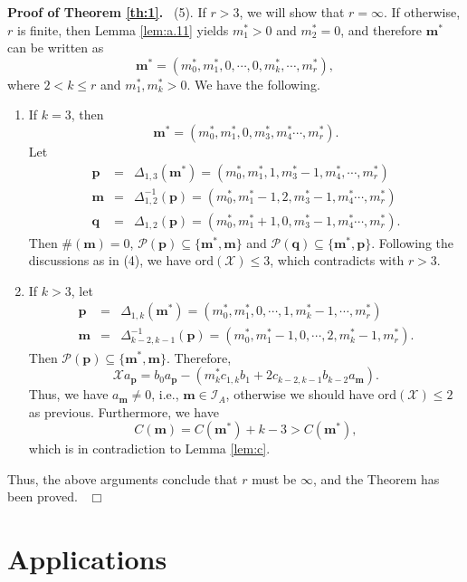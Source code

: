 \documentclass[preprint,12pt]{elsarticle}
\newenvironment{proof}[1][Proof]{\textbf{#1.}\ }{\ $\Box$}
\begin{document}
\begin{proof}[Proof of Theorem \ref{th:1}]
(5). If $r > 3$, we will show that $r = \infty$. If otherwise, $r$ is finite, then  Lemma \ref{lem:a.11} yields $m_1^*>0$ and $m_2^* = 0$, and therefore $\mathbf{m}^*$ can be written as 
$$\mathbf{m}^* = (m_0^*, m_1^*, 0,\cdots, 0, m_k^*, \cdots, m_r^*),$$
where $2 < k \leq r$ and $m_1^*, m_k^* >0 $.  We have the following.
\begin{enumerate}
\item[(a)] If $k = 3$, then 
$$\mathbf{m}^* = (m_0^*, m_1^*,0,m_3^*,m_4^*\cdots, m_r^*).$$
Let
\begin{eqnarray*}
\mathbf{p}&=& \Delta_{1,3}(\mathbf{m}^*) = (m_0^*,m_1^*,1,m_3^*-1,m_4^*,\cdots,m_r^*)\\
\mathbf{m}&=&\Delta_{1,2}^{-1}(\mathbf{p}) =  (m_0^*,m_1^*-1,2,m_3^*-1,m_4^*\cdots,m_r^*)\\
\mathbf{q} &=& \Delta_{1,2}(\mathbf{p}) = (m_0^*,m_1^*+1,0,m_3^*-1,m_4^*\cdots,m_r^*).
\end{eqnarray*}
Then $\#(\mathbf{m}) = 0$, $\mathcal{P}(\mathbf{p}) \subseteq \{\mathbf{m}^*, \mathbf{m}\}$ and $\mathcal{P}(\mathbf{q}) \subseteq \{\mathbf{m}^*, \mathbf{p}\}$.  Following the discussions as in (4), we have $\mathrm{ord}(\mathscr{X})\leq 3$, which contradicts with $r>3$.

\item[(b)] If $k>3$, let
\begin{eqnarray*}
\mathbf{p}&=&\Delta_{1,k}(\mathbf{m}^*) =(m_0^*,m_1^*,0,\cdots,1,m_k^*-1,\cdots,m_r^*)\\
\mathbf{m}&=&\Delta_{k-2,k-1}^{-1}(\mathbf{p}) = (m_0^*,m_1^*-1,0,\cdots,2,m_k^*-1,m_r^*).
\end{eqnarray*}
Then $\mathcal{P}(\mathbf{p})\subseteq \{\mathbf{m}^*,\mathbf{m}\}$. Therefore,
$$\mathscr{X}a_{\mathbf{p}} = b_0 a_{\mathbf{p}} - (m_k^* c_{1,k} b_1+ 2 c_{k-2,k-1} b_{k-2} a_{\mathbf{m}}).$$
Thus, we have $a_{\mathbf{m}}\not=0$, i.e., $\mathbf{m}\in \mathcal{I}_A$, otherwise we should have $\mathrm{ord}(\mathscr{X}) \leq 2$ as previous.  Furthermore, we have
$$C(\mathbf{m}) = C(\mathbf{m}^*) + k-3 > C(\mathbf{m}^*),$$
which is in contradiction to Lemma \ref{lem:c}.
\end{enumerate}
Thus, the above arguments conclude that $r$ must be $\infty$, and the Theorem has been proved.
\end{proof}

\section{Applications}
\label{sec:appl}
\end{document}
